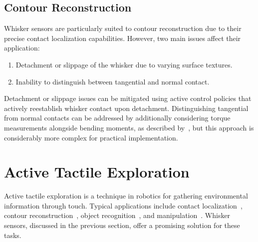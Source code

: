 \subsection{Contour Reconstruction}
Whisker sensors are particularly suited to contour reconstruction due to their precise contact localization capabilities.
However, two main issues affect their application:

\begin{enumerate}
    \item Detachment or slippage of the whisker due to varying surface textures.
    \item Inability to distinguish between tangential and normal contact.
\end{enumerate}

Detachment or slippage issues can be mitigated using active control policies that actively reestablish whisker contact upon detachment.
Distinguishing tangential from normal contacts can be addressed by additionally considering torque measurements alongside bending moments, as described by~\cite{doi:10.1089/soro.2016.0028}, but this approach is considerably more complex for practical implementation.


\section{Active Tactile Exploration}
Active tactile exploration is a technique in robotics for gathering environmental information through touch.
Typical applications include contact localization~\cite{doi:10.1089/soro.2016.0028}, contour reconstruction~\cite{lin2022whiskerinspiredtactilesensingcontact}, object recognition~\cite{Xiao_2022}, and manipulation~\cite{Brouwer2024TactileInformedAP}.
Whisker sensors, discussed in the previous section, offer a promising solution for these tasks.

